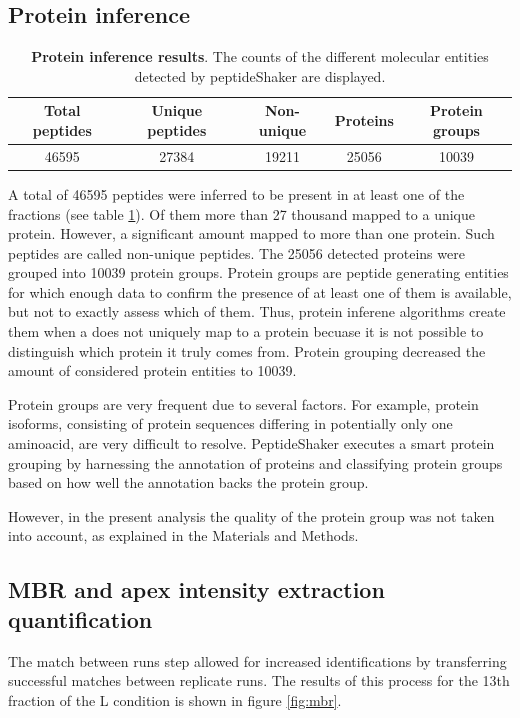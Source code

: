 \documentclass[11pt, a4paper]{report}
\begin{document}
\subsection{Protein inference}

\begin{table}[H]
\begin{tabular}{ccccc}
  \toprule
 Total peptides & Unique peptides & Non-unique & Proteins & Protein groups \\ 
  \midrule
 46595 & 27384 & 19211 & 25056 & 10039 \\
 \bottomrule
\end{tabular}
\caption{\textbf{Protein inference results}. The counts of the different molecular entities detected by peptideShaker are displayed.}
\label{tab:protein_inference}
\end{table}

A total of 46595 peptides were inferred to be present in at least one of the fractions (see table \ref{tab:protein_inference}). Of them more than 27 thousand mapped to a unique protein. However, a significant amount mapped to more than one protein. Such peptides are called non-unique peptides. The 25056 detected proteins were grouped into 10039 protein groups. Protein groups are peptide generating entities for which enough data to confirm the presence of at least one of them is available, but not to exactly assess which of them. Thus, protein inferene algorithms create them when a does not uniquely map to a protein becuase it is not possible to distinguish which protein it truly comes from. Protein grouping decreased the amount of  considered protein entities to 10039.

Protein groups are very frequent due to several factors. For example, protein isoforms, consisting of protein sequences differing in potentially only one aminoacid, are very difficult to resolve. PeptideShaker executes a smart protein grouping by harnessing the annotation of proteins and classifying protein groups based on how well the annotation backs the protein group.

However, in the present analysis the quality of the protein group was not taken into account, as explained in the Materials and Methods.


\subsection{MBR and apex intensity extraction quantification}

The match between runs step allowed for increased identifications by transferring successful matches between replicate runs. The results of this process for the 13th fraction of the L condition is shown in figure \ref{fig:mbr}.
\end{document}
